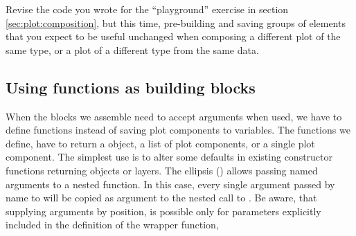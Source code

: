 \documentclass[krantz2]{krantz}\usepackage{knitr}
\begin{document}
\begin{knitrout}\footnotesize
{}\color{fgcolor}\begin{kframe}
\begin{alltt}
 \hlkwb{<-}  \hlstd{(}\hlstd{))}
 \hlopt{+} 
\end{alltt}
\end{kframe}
\end{knitrout}

\begin{playground}
Revise the code you wrote for the ``playground'' exercise in section \ref{sec:plot:composition}, but this time, pre-building and saving groups of elements that you expect to be useful unchanged when composing a different plot of the same type, or a plot of a different type from the same data.
\end{playground}

\subsection{Using functions as building blocks}

When the blocks we assemble need to accept arguments when used, we have to define functions instead of saving plot components to variables. The functions we define, have to return a  object, a list of plot components, or a single plot component. The simplest use is to alter some defaults in existing constructor functions returning  objects or layers. The ellipsis () allows passing named arguments to a nested function. In this case, every single argument passed by name to  will be copied as argument to the nested call to . Be aware, that supplying arguments by position, is possible only for parameters explicitly included in the definition of the wrapper function,

\begin{knitrout}\footnotesize
{}\color{fgcolor}\begin{kframe}
\begin{alltt}
 \hlkwb{<-} \hlstd{(}\hlstd{) \{}
   \hlopt{+}
  \hlstd{()}
\hlstd{\}}
\end{alltt}
\end{kframe}
\end{knitrout}
\end{document}
